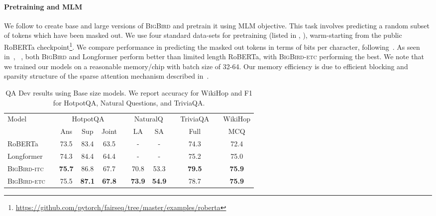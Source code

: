 \documentclass{article}
\newcommand{\bigb}{\textsc{BigBird}\xspace}
\begin{document}
\paragraph{Pretraining and MLM}
We follow \citep{devlin2018bert, liu2019roberta} to create base and large versions of \bigb and pretrain it using MLM objective. 
This task involves predicting a random subset of tokens which have been masked out. 
We use four standard data-sets for pretraining (listed in , ), warm-starting from the public RoBERTa checkpoint\footnote{\url{https://github.com/pytorch/fairseq/tree/master/examples/roberta}}. 
We compare performance in predicting the masked out tokens in terms of bits per character, following~\citep{beltagy2020longformer}. 
As seen in~, ~,  both \bigb and Longformer perform better than limited length RoBERTa, with \bigb-\textsc{etc} performing the best.
We note that we trained our models on a 
reasonable  memory/chip with batch size of 32-64.
Our memory efficiency is due to efficient blocking and sparsity structure of 
the sparse attention mechanism described in~. 
\begin{table}
    \centering
    \small
    \begin{tabular}{@{}l c c c ccc c cc c c@{}}
    \toprule
    \multirow{2}{*}{Model} & & 
    \multicolumn{3}{c}{HotpotQA} & &
    \multicolumn{2}{c}{NaturalQ} & &
    TriviaQA & & 
    WikiHop\\
    \cmidrule{3-5} \cmidrule{7-8} \cmidrule{10-10}  \cmidrule{12-12} 
               && Ans & Sup & Joint  &&  LA & SA && Full && MCQ  \\
    \midrule
    RoBERTa     && 73.5 & 83.4 & 63.5 &&  -   &  -  && 74.3 && 72.4  \\
    Longformer  && 74.3 & 84.4 & 64.4 &&  -   &  -  && 75.2 && 75.0  \\
    \bigb-\textsc{itc}  && \textbf{75.7} & 86.8 & 67.7 && 70.8 & 53.3 && \textbf{79.5} && \textbf{75.9} \\
    \bigb-\textsc{etc}  && 75.5 & \textbf{87.1} & \textbf{67.8} && \textbf{73.9} & \textbf{54.9} && 78.7 && \textbf{75.9} \\
    \bottomrule
    \end{tabular}
    \vspace{2mm}
    \caption{QA Dev results using Base size models. We report accuracy for WikiHop and F1 for HotpotQA, Natural Questions, and TriviaQA.}
    \label{tab:QADev}
\end{table}
\end{document}
